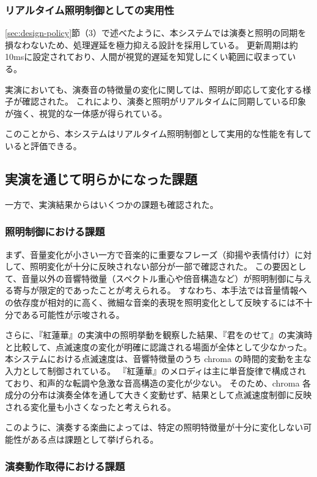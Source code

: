 \subsubsection{リアルタイム照明制御としての実用性}

\ref{sec:design-policy}節（3）で述べたように、本システムでは演奏と照明の同期を損なわないため、処理遅延を極力抑える設計を採用している。
更新周期は約10msに設定されており、人間が視覚的遅延を知覚しにくい範囲に収まっている。

実演においても、演奏音の特徴量の変化に関しては、照明が即応して変化する様子が確認された。
これにより、演奏と照明がリアルタイムに同期している印象が強く、視覚的な一体感が得られている。

このことから、本システムはリアルタイム照明制御として実用的な性能を有していると評価できる。

\subsection{実演を通じて明らかになった課題}

一方で、実演結果からはいくつかの課題も確認された。

\subsubsection{照明制御における課題}

まず、音量変化が小さい一方で音楽的に重要なフレーズ（抑揚や表情付け）に対して、照明変化が十分に反映されない部分が一部で確認された。
この要因として、音量以外の音響特徴量（スペクトル重心や倍音構造など）が照明制御に与える寄与が限定的であったことが考えられる。
すなわち、本手法では音量情報への依存度が相対的に高く、微細な音楽的表現を照明変化として反映するには不十分である可能性が示唆される。

さらに、『紅蓮華』の実演中の照明挙動を観察した結果、『君をのせて』の実演時と比較して、点滅速度の変化が明確に認識される場面が全体として少なかった。
本システムにおける点滅速度は、音響特徴量のうち chroma の時間的変動を主な入力として制御されている。
『紅蓮華』のメロディは主に単音旋律で構成されており、和声的な転調や急激な音高構造の変化が少ない。
そのため、chroma 各成分の分布は演奏全体を通して大きく変動せず、結果として点滅速度制御に反映される変化量も小さくなったと考えられる。

このように、演奏する楽曲によっては、特定の照明特徴量が十分に変化しない可能性がある点は課題として挙げられる。

\subsubsection{演奏動作取得における課題}


